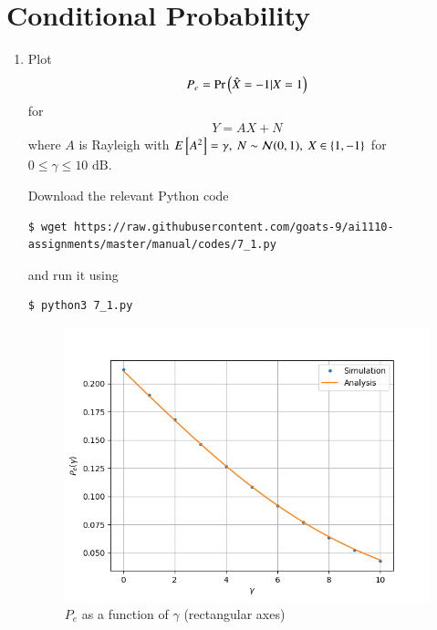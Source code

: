 \documentclass[journal,12pt,twocolumn]{IEEEtran}
\renewcommand\thesection{\arabic{section}}
\begin{document}
\section{Conditional Probability}
\begin{enumerate}[label=\thesection.\arabic*
,ref=\thesection.\theenumi]
\item Plot 
	\begin{align}
		P_e = \Pr\left(\hat{X} = -1|X = 1\right)
	\end{align}
for 
	\begin{align}
		Y = AX + N
	\end{align}
where $A$ is Rayleigh with $E{}\left[A^2\right] = \gamma,\ N \sim \mathcal{N}(0, 1),\ X \in \left\{1, -1\right\}$ for $0 \leq \gamma \leq 10 \text{ dB}$.

\solution
Download the relevant Python code
\begin{lstlisting}
$ wget https://raw.githubusercontent.com/goats-9/ai1110-assignments/master/manual/codes/7_1.py
\end{lstlisting}
and run it using
\begin{lstlisting}
$ python3 7_1.py
\end{lstlisting}
\begin{figure}[!htb]
	\includegraphics[width=\columnwidth]{figs/7_1.png}
	\caption{$P_e$ as a function of $\gamma$ (rectangular axes)}
	\label{fig:err-gamma}
\end{figure}
\begin{figure}[!htb]

\end{figure}
\end{enumerate}
\end{document}
